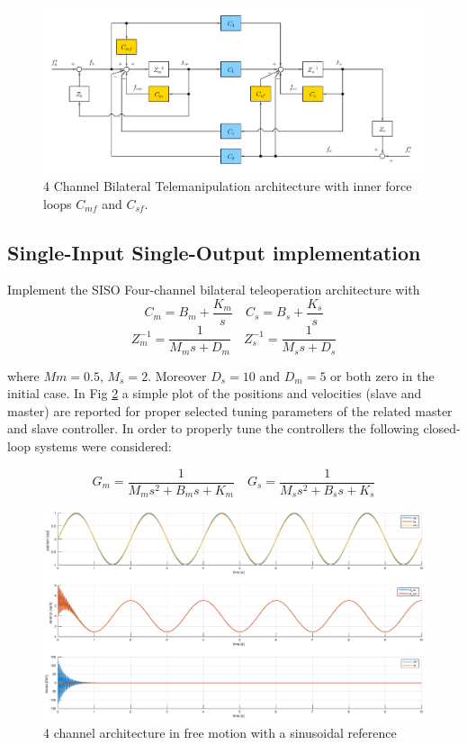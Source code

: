 \documentclass[a4paper,12pt]{article}
\begin{document}
\begin{figure}[H]
    \begin{center}
        \hspace*{-2cm}
        \includegraphics[scale=0.3]{images/four_channel.png}
    \end{center}
    \caption{4 Channel Bilateral Telemanipulation architecture with inner force loops $C_{mf}$ and $C_{sf}$.}
    \label{fig:four_channel}
\end{figure}

\subsection{Single-Input Single-Output implementation}
Implement the SISO Four-channel bilateral teleoperation architecture with
\[
    C_m = B_m + \frac{K_m}{s} \quad
    C_s = B_s + \frac{K_s}{s}
\]
\[
    Z_m^{-1} = \frac{1}{M_ms + D_m} \quad
    Z_s^{-1} = \frac{1}{M_ss + D_s}
\]

\bigskip
\noindent where $Mm = 0.5$, $M_s = 2$. Moreover $D_s = 10$ and $D_m = 5$ or both zero in the initial case. In Fig \ref{fig:four_free} a simple plot of the positions and velocities (slave and master) are reported for proper selected tuning parameters of the related master and slave controller. In order to properly tune the controllers the following closed-loop systems were considered:

\[
G_m = \frac{1}{M_ms^2+B_ms+K_m} \quad
G_s = \frac{1}{M_ss^2+B_ss+K_s}
\]

\begin{figure}[H]
    \begin{center}
        \hspace*{-4.4cm}
        \includegraphics[scale=0.5]{images/four_free_motion.eps}
    \end{center}
    \caption{4 channel architecture in free motion with a sinusoidal reference}
    \label{fig:four_free}
\end{figure}
\end{document}
